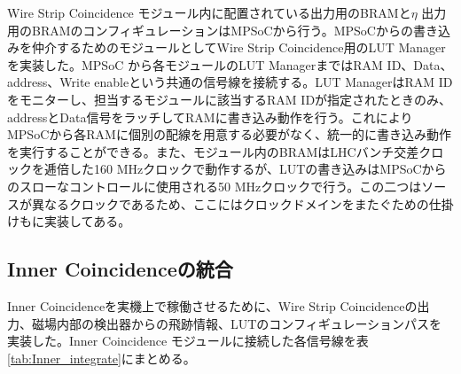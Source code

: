 Wire Strip Coincidence モジュール内に配置されている\pt 出力用のBRAMと$\eta$ 出力用のBRAMのコンフィギュレーションはMPSoCから行う。MPSoCからの書き込みを仲介するためのモジュールとしてWire Strip Coincidence用のLUT Managerを実装した。MPSoC から各モジュールのLUT ManagerまではRAM ID、Data、address、Write enableという共通の信号線を接続する。LUT ManagerはRAM IDをモニターし、担当するモジュールに該当するRAM IDが指定されたときのみ、addressとData信号をラッチしてRAMに書き込み動作を行う。これによりMPSoCから各RAMに個別の配線を用意する必要がなく、統一的に書き込み動作を実行することができる。また、モジュール内のBRAMはLHCバンチ交差クロックを逓倍した160 MHzクロックで動作するが、LUTの書き込みはMPSoCからのスローなコントロールに使用される50 MHzクロックで行う。この二つはソースが異なるクロックであるため、ここにはクロックドメインをまたぐための仕掛けもに実装してある。

\subsection{Inner Coincidenceの統合}
Inner Coincidenceを実機上で稼働させるために、Wire Strip Coincidenceの出力、磁場内部の検出器からの飛跡情報、LUTのコンフィギュレーションパスを実装した。Inner Coincidence モジュールに接続した各信号線を表\ref{tab:Inner_integrate}にまとめる。

